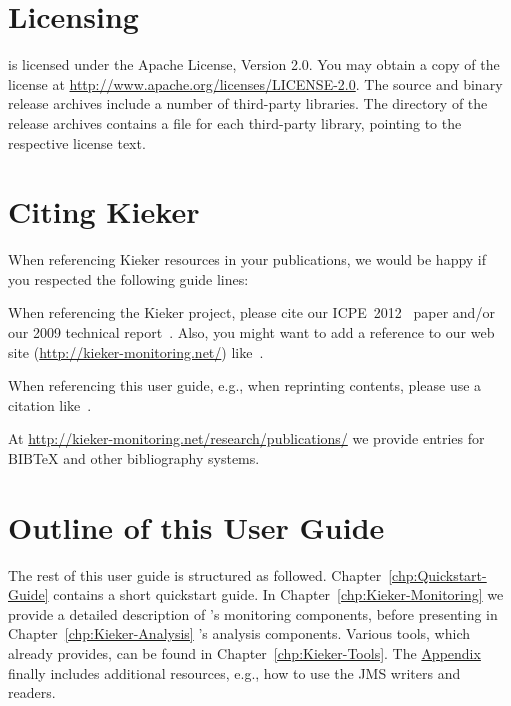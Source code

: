 	\section{Licensing}
		\Kieker{} is licensed under the Apache License, Version 2.0. You may obtain a copy of the license at \url{http://www.apache.org/licenses/LICENSE-2.0}. The \Kieker{} source and binary release archives include a number of third-party libraries. The  directory of the release archives contains a  file for each third-party library, pointing to the respective license text.	
		
	\section{Citing Kieker}\label{sec:ch1:citingKieker}
		When referencing Kieker resources in your publications, we would be happy if you respected the following guide lines:

		\begin{compactitem}
			\item 
			When referencing the Kieker project, please cite our ICPE~2012~\cite{KiekerICPE2012} paper and/or our 2009 technical report~\cite{vanHoornRohrHasselbringWallerEhlersFreyKieselhorst2009TRContinuousMonitoringOfSoftwareServicesDesignAndApplicationOfTheKiekerFramework}. Also, you might want to add a reference to our web site (\url{http://kieker-monitoring.net/}) like~\cite{KiekerWebSite}. 
			\item 
			When referencing this user guide, e.g., when reprinting contents, please use a citation like~\cite{Kieker1.7UserGuide}.
		\end{compactitem}

		\noindent At \url{http://kieker-monitoring.net/research/publications/} we provide entries for $\mathrm{B\scriptstyle IB}\!$\TeX{} and other bibliography systems.
		
	\section{Outline of this User Guide}
		The rest of this user guide is structured as followed. Chapter~\ref{chp:Quickstart-Guide} contains a short quickstart guide. In Chapter~\ref{chp:Kieker-Monitoring} we provide a detailed description of \Kieker{}'s monitoring components, before presenting in Chapter~\ref{chp:Kieker-Analysis} \Kieker{}'s analysis components. Various tools, which \Kieker{} already provides, can be found in Chapter~\ref{chp:Kieker-Tools}. The \hyperlink{hypertarget:appendix}{Appendix} finally includes additional resources, e.g., how to use the JMS writers and readers.